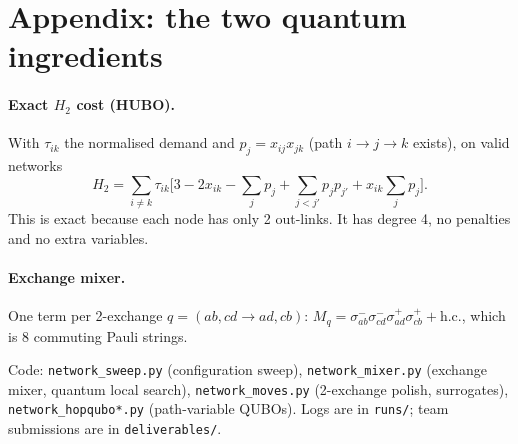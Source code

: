\documentclass[11pt]{article}
\begin{document}
\appendix
\section{Appendix: the two quantum ingredients}
\paragraph{Exact $H_2$ cost (HUBO).} With $\tau_{ik}$ the normalised demand and $p_j=x_{ij}x_{jk}$
(path $i\to j\to k$ exists), on valid networks
\[
  H_2=\sum_{i\neq k}\tau_{ik}\Big[3-2x_{ik}-\sum_j p_j+\sum_{j<j'}p_jp_{j'}+x_{ik}\sum_j p_j\Big].
\]
This is exact because each node has only 2 out-links. It has degree 4, no penalties and no extra variables.

\paragraph{Exchange mixer.} One term per 2-exchange $q=(ab,cd\to ad,cb)$:
$M_q=\sigma^-_{ab}\sigma^-_{cd}\sigma^+_{ad}\sigma^+_{cb}+\text{h.c.}$, which is 8 commuting Pauli strings.
\begin{center}
\end{center}

\vfill\noindent\footnotesize
Code: \texttt{network\_sweep.py} (configuration sweep), \texttt{network\_mixer.py} (exchange mixer,
quantum local search), \texttt{network\_moves.py} (2-exchange polish, surrogates),
\texttt{network\_hopqubo*.py} (path-variable QUBOs). Logs are in \texttt{runs/}; team submissions are in
\texttt{deliverables/}.
\end{document}
